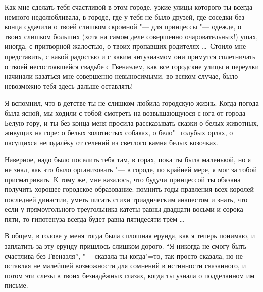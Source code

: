Как мне сделать тебя счастливой в этом городе, узкие улицы которого ты всегда
немного недолюбливала, в городе, где у тебя не было друзей, где соседки без
конца судачили о твоей слишком скромной "--- для принцессы "--- одежде, о твоих
слишком больших (хотя на самом деле совершенно очаровательных!) ушах, иногда, с
притворной жалостью, о твоих пропавших родителях \ldots\
Стоило мне представить, с какой радостью и с каким энтузиазмом они примутся
сплетничать о твоей несостоявшейся свадьбе с Гвенаэлем, как все городские улицы
и переулки начинали казаться мне совершенно невыносимыми, во всяком случае, было
невозможно тебя здесь дальше оставлять!

Я вспомнил, что в детстве ты не слишком любила городскую жизнь.
Когда погода была ясной, мы ходили с тобой смотреть на возвышающуюся с юга от
города Белую гору, и ты без конца меня просила рассказывать сказки о белых
животных, живущих на горе: о белых золотистых собаках, о бело"=голубых орлах,
о пасущихся неподалёку от селений из светлого камня белых козочках.

Наверное, надо было поселить тебя там, в горах, пока ты была маленькой, но я не
знал, как это было организовать "--- в городе, по крайней мере, я мог за тобой
присматривать.
К тому же, мне казалось, что будучи принцессой ты обязана получить хорошее
городское образование: помнить годы правления всех королей последней династии,
уметь писать стихи триадическим анапестом и знать, что если у прямоугольного
треугольника катеты равны двадцати восьми и сорока пяти, то гипотенуза всегда
будет равна пятидесяти трём \ldots

В общем, в голове у меня тогда была сплошная ерунда, как я теперь понимаю, и
заплатить за эту ерунду пришлось слишком дорого. \enquote{Я никогда не смогу
быть счастлива без Гвенаэля}, "--- сказала ты когда"=то, так просто сказала, но
не оставляя не малейшей возможности для сомнений в истинности сказанного, и
потом эти слезы в твоих безнадёжных глазах, когда ты узнала о подделанном им
письме.

